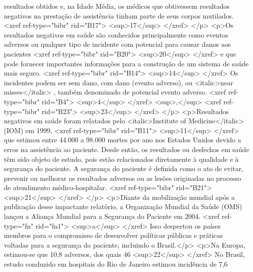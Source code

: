         resultados obtidos e, na Idade Média, os médicos que obtivessem resultados negativos na
        prestação de assistência tinham parte de seus corpos mutilados. <xref ref-type="bibr"
          rid="B17">
          <sup>17</sup>
        </xref>
      </p>
      <p>Os resultados negativos em saúde são conhecidos principalmente como eventos adversos ou
        qualquer tipo de incidente com potencial para causar danos aos pacientes <xref
          ref-type="bibr" rid="B20">
          <sup>20</sup>
        </xref> e que pode fornecer importantes informações para a construção de um sistema de saúde
        mais seguro. <xref ref-type="bibr" rid="B14">
          <sup>14</sup>
        </xref> Os incidentes podem ser sem dano, com dano (evento adverso), ou <italic>near
          misses</italic> , também denominado de potencial evento adverso. <xref ref-type="bibr"
          rid="B4">
          <sup>4</sup>
        </xref>
        <sup>,</sup>
        <xref ref-type="bibr" rid="B23">
          <sup>23</sup>
        </xref>
      </p>
      <p>Resultados negativos em saúde foram relatados pelo <italic>Institute of Medicine</italic>
        (IOM) em 1999, <xref ref-type="bibr" rid="B11">
          <sup>11</sup>
        </xref> que estimou entre 44.000 a 98.000 mortes por ano nos Estados Unidos devido a erros
        na assistência ao paciente. Desde então, os resultados ou desfechos em saúde têm sido objeto
        de estudo, pois estão relacionados diretamente à qualidade e à segurança do paciente. A
        segurança do paciente é definida como o ato de evitar, prevenir ou melhorar os resultados
        adversos ou as lesões originadas no processo de atendimento médico-hospitalar. <xref
          ref-type="bibr" rid="B21">
          <sup>21</sup>
        </xref>
      </p>
      <p>Diante da mobilização mundial após a publicação desse impactante relatório, a Organização
        Mundial da Saúde (OMS) lançou a Aliança Mundial para a Segurança do Paciente em 2004. <xref
          ref-type="fn" rid="fn1">
          <sup>a</sup>
        </xref> Isso despertou os países membros para o compromisso de desenvolver políticas
        públicas e práticas voltadas para a segurança do paciente, incluindo o Brasil.</p>
      <p>Na Europa, estimou-se que 10,8%
        adversos, dos quais 46%
          <sup>22</sup>
        </xref> No Brasil, estudo conduzido em hospitais do Rio de Janeiro estimou incidência de
        7,6%

